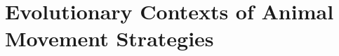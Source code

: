 \documentclass[ twoside,openright,titlepage,numbers=noenddot,%
                headinclude,footinclude,clearpage=empty,abstract=on,toc=flat,
                BCOR=5mm,paper=b5,fontsize=11pt,dvipsnames
                ]{scrbook}
\begin{document}
\cleardoublepage 
\part{Evolutionary Contexts of Animal Movement Strategies}


% 

\cleardoublepage 


% 



% 

% 

\appendix
\cleardoublepage

\end{document}
